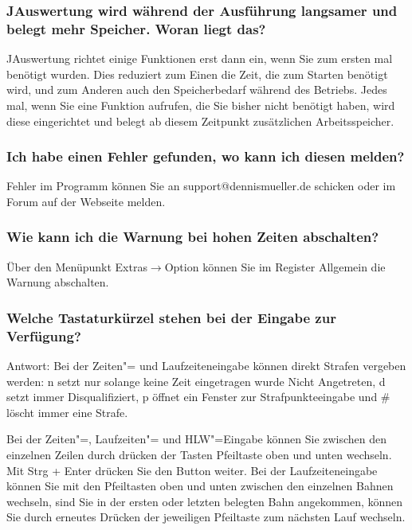 \documentclass[11pt,a4paper,twoside,ngerman]{article}
\begin{document}
\subsubsection*{JAuswertung wird während der Ausführung langsamer und belegt mehr Speicher. Woran liegt das?}
JAuswertung richtet einige Funktionen erst dann ein, wenn Sie zum ersten mal benötigt wurden. Dies reduziert zum Einen die Zeit, die zum Starten benötigt wird, und zum Anderen auch den Speicherbedarf während des Betriebs. Jedes mal, wenn Sie eine Funktion aufrufen, die Sie bisher nicht benötigt haben, wird diese eingerichtet und belegt ab diesem Zeitpunkt zusätzlichen Arbeitsspeicher.


\subsubsection*{Ich habe einen Fehler gefunden, wo kann ich diesen melden?}
Fehler im Programm können Sie an support@dennismueller.de schicken oder im Forum auf der Webseite melden.


\subsubsection*{Wie kann ich die Warnung bei hohen Zeiten abschalten?}
Über den Menüpunkt Extras\ensuremath{\rightarrow}Option können Sie im Register Allgemein die Warnung abschalten.


\subsubsection*{Welche Tastaturkürzel stehen bei der Eingabe zur Verfügung?}
Antwort: Bei der Zeiten"= und Laufzeiteneingabe können direkt Strafen vergeben werden: \glqq{}n\grqq{} setzt nur solange keine Zeit eingetragen wurde \glqq{}Nicht Angetreten\grqq{}, \glqq{}d\grqq{} setzt immer \glqq{}Disqualifiziert\grqq{}, \glqq{}p\grqq{} öffnet ein Fenster zur Strafpunkteeingabe und \glqq{}\#\grqq{} löscht immer eine Strafe.

Bei der Zeiten"=, Laufzeiten"= und HLW"=Eingabe können Sie zwischen den einzelnen Zeilen durch drücken der Tasten Pfeiltaste oben und unten wechseln. Mit \glqq{}Strg + Enter\grqq{} drücken Sie den Button \glqq{}weiter\grqq{}. Bei der Laufzeiteneingabe können Sie mit den Pfeiltasten oben und unten zwischen den einzelnen Bahnen wechseln, sind Sie in der ersten oder letzten belegten Bahn angekommen, können Sie durch erneutes Drücken der jeweiligen Pfeiltaste zum nächsten Lauf wechseln.
\end{document}
